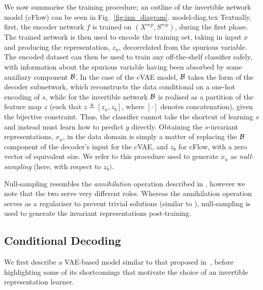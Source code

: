 We now summarise the training procedure; an outline of the invertible network model (\acs{cFlow})
can be seen in Fig.~\ref{fig:inn_diagram}.
%
{model-diag.tex}
%
Textually, first, the encoder network $f$ is trained on \( (X^{rep}, S^{rep}) \), during the first
phase.
%
The trained network is then used to encode the training set, taking in input $x$ and producing the
representation, $z_u$, decorrelated from the spurious variable.
%
The encoded dataset can then be used to train any off-the-shelf classifier safely, with information
about the spurious variable having been absorbed by some auxiliary component ${\mathcal{B}}$.
%
In the case of the \acf{cVAE} model, ${\mathcal{B}}$ takes the form of the decoder subnetwork, which
reconstructs the data conditional on a one-hot encoding of $s$, while for the invertible network
${\mathcal{B}}$ is realised as a partition of the feature map $z$ (such that $z \triangleq [z_u, z_b]$,
where \( [\cdot] \) denotes concatenation), given the bijective constraint.
%
Thus, the classifier cannot take the shortcut of learning $s$ and instead must learn how to predict
$y$ directly.
%
Obtaining the $s$-invariant representations, $x_u$, in the data domain is simply a matter of
replacing the ${\mathcal{B}}$ component of the decoder's input for the \ac{cVAE}, and $z_b$ for
\ac{cFlow}, with a zero vector of equivalent size.
%
We refer to this procedure used to generate $x_u$ as \emph{null-sampling} (here, with respect
to $z_b)$.

Null-sampling resembles the \emph{annihilation} operation described in \citet{xiao2017dna}, however
we note that the two serve very different roles.  
%
Whereas the annihilation operation serves as a regulariser to prevent trivial solutions (similar to
\citealp{jaiswal2018unsupervised}), null-sampling is used to generate the invariant representations
post-training.

\subsection{Conditional Decoding}%
%
\label{conddec}
\noindent We first describe a \acs{VAE}-based model similar to that proposed
in~\citet{madras2018learning}, before highlighting some of its shortcomings that motivate the
choice of an invertible representation learner.

